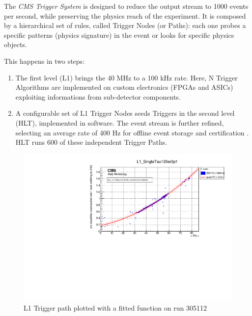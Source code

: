 The \textit{CMS Trigger System} is designed to reduce the output stream to 1000 events per second, while preserving the physics reach of the experiment.
It is composed by a hierarchical set of rules, called Trigger Nodes (or Paths): each one probes a specific patterns (physics signature) in the event or looks for specific physics objects.

This happens in two steps:

\begin{enumerate}

    \item The first level (L1) \cite{Bayatyan:706847} brings the 40 MHz to a 100 kHz rate. Here, N Trigger Algorithms are implemented on custom electronics (FPGAs and ASICs) exploiting informations from sub-detector components.

    \item A configurable set of L1 Trigger Nodes seeds Triggers in the second level (HLT), implemented in software. The event stream is further refined, selecting an average rate of 400 Hz for offline event storage and certification \cite{Khachatryan_2017}. HLT runs 600 of these independent Trigger Paths.

\end{enumerate}

\begin{figure}
    \centerline{
        \includegraphics[width=0.6\paperwidth]{figures/RMT_305112_L1_SingleTau120er2p1.pdf}}
    \caption{L1 Trigger path plotted with a fitted function on run 305112}
    \label{fig:ratemon_l1}
\end{figure}

